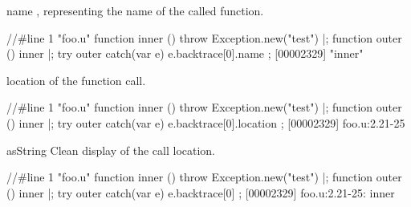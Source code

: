 \begin{urbiscriptapi}
\item[name] , representing the name of the called
  function.
\begin{urbiscript}[firstline=1]
//#line 1 "foo.u"
function inner () { throw Exception.new("test") }|;
function outer () { inner }|;
try
{
  outer
}
catch(var e)
{
  e.backtrace[0].name
};
[00002329] "inner"
\end{urbiscript}

\item[location]  of the function call.
\begin{urbiscript}[firstline=1]
//#line 1 "foo.u"
function inner () { throw Exception.new("test") }|;
function outer () { inner }|;
try
{
  outer
}
catch(var e)
{
  e.backtrace[0].location
};
[00002329] foo.u:2.21-25
\end{urbiscript}

\item[asString] Clean display of the call location.
\begin{urbiscript}[firstline=1]
//#line 1 "foo.u"
function inner () { throw Exception.new("test") }|;
function outer () { inner }|;
try
{
  outer
}
catch(var e)
{
  e.backtrace[0]
};
[00002329] foo.u:2.21-25: inner
\end{urbiscript}

\end{urbiscriptapi}


